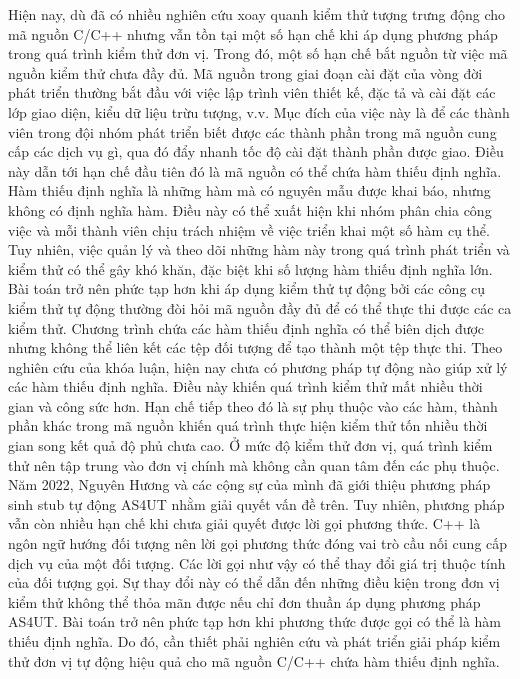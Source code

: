 Hiện nay, dù đã có nhiều nghiên cứu xoay quanh kiểm thử tượng trưng động cho mã nguồn C/C++ nhưng vẫn tồn tại một số hạn chế khi áp dụng phương pháp trong quá trình kiểm thử đơn vị. Trong đó, một số hạn chế bắt nguồn từ việc mã nguồn kiểm thử chưa đầy đủ. Mã nguồn trong giai đoạn cài đặt của vòng đời phát triển thường bắt đầu với việc lập trình viên thiết kế, đặc tả và cài đặt các lớp giao diện, kiểu dữ liệu trừu tượng, v.v. Mục đích của việc này là để các thành viên trong đội nhóm phát triển biết được các thành phần trong mã nguồn cung cấp các dịch vụ gì, qua đó đẩy nhanh tốc độ cài đặt thành phần được giao. Điều này dẫn tới hạn chế đầu tiên đó là mã nguồn có thể chứa hàm thiếu định nghĩa. Hàm thiếu định nghĩa là những hàm mà có nguyên mẫu được khai báo, nhưng không có định nghĩa hàm. Điều này có thể xuất hiện khi nhóm phân chia công việc và mỗi thành viên chịu trách nhiệm về việc triển khai một số hàm cụ thể. Tuy nhiên, việc quản lý và theo dõi những hàm này trong quá trình phát triển và kiểm thử có thể gây khó khăn, đặc biệt khi số lượng hàm thiếu định nghĩa lớn. Bài toán trở nên phức tạp hơn khi áp dụng kiểm thử tự động bởi các công cụ kiểm thử tự động thường đòi hỏi mã nguồn đầy đủ để có thể thực thi được các ca kiểm thử. Chương trình chứa các hàm thiếu định nghĩa có thể biên dịch được nhưng không thể liên kết các tệp đối tượng để tạo thành một tệp thực thi. Theo nghiên cứu của khóa luận, hiện nay chưa có phương pháp tự động nào giúp xử lý các hàm thiếu định nghĩa. Điều này khiến quá trình kiểm thử mất nhiều thời gian và công sức hơn. Hạn chế tiếp theo đó là sự phụ thuộc vào các hàm, thành phần khác trong mã nguồn khiến quá trình thực hiện kiểm thử tốn nhiều thời gian song kết quả độ phủ chưa cao. Ở mức độ kiểm thử đơn vị, quá trình kiểm thử nên tập trung vào đơn vị chính mà không cần quan tâm đến các phụ thuộc. Năm 2022, Nguyên Hương và các cộng sự của mình đã giới thiệu phương pháp sinh stub tự động AS4UT \cite{TUNG2022106821} nhằm giải quyết vấn đề trên. Tuy nhiên, phương pháp vẫn còn nhiều hạn chế khi chưa giải quyết được lời gọi phương thức. C++ là ngôn ngữ hướng đối tượng nên lời gọi phương thức đóng vai trò cầu nối cung cấp dịch vụ của một đối tượng. Các lời gọi như vậy có thể thay đổi giá trị thuộc tính của đối tượng gọi. Sự thay đổi này có thể dẫn đến những điều kiện trong đơn vị kiểm thử không thể thỏa mãn được nếu chỉ đơn thuần áp dụng phương pháp AS4UT. Bài toán trở nên phức tạp hơn khi phương thức được gọi có thể là hàm thiếu định nghĩa. Do đó, cần thiết phải nghiên cứu và phát triển giải pháp kiểm thử đơn vị tự động hiệu quả cho mã nguồn C/C++ chứa hàm thiếu định nghĩa. 

